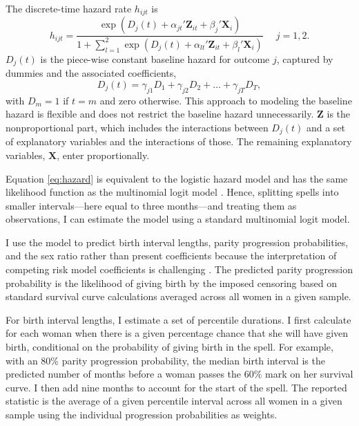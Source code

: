 \documentclass[12pt,letterpaper]{article}
\begin{document}
The discrete-time hazard rate $h_{ijt}$ is 
\begin{equation}
 h_{ijt} = \frac{\exp(D_j(t) + \alpha_{jt}'\mathbf{Z}_{it} + \beta_j'\mathbf{X}_{i})} 
 {1 + \sum_{l=1}^2 \exp(D_j(t) + \alpha_{lt}'\mathbf{Z}_{it} + \beta_l'\mathbf{X}_{i})} \: \: \; \; \;  j = 1,2.
 \label{eq:hazard}
\end{equation}
$D_{j}(t)$ is the piece-wise constant baseline hazard for outcome $j$, captured
by dummies and the associated coefficients,
\begin{equation}
D_j(t) = \gamma_{j1} D_1 + \gamma_{j2} D_2 + \ldots + \gamma_{jT} D_T,
\end{equation}
with $D_m = 1$ if $t=m$ and zero otherwise.
This approach to modeling the baseline hazard is flexible and does not restrict the 
baseline hazard unnecessarily.
$\mathbf{Z}$ is the nonproportional part, which includes the interactions between 
$D_j(t)$ and a set of explanatory variables and the interactions of those.
The remaining explanatory variables, $\mathbf{X}$, enter proportionally.




Equation \ref{eq:hazard} is equivalent to the logistic hazard model and has the same 
likelihood function as the multinomial logit model \citep{allison82,jenkins95}.
Hence, splitting spells into smaller intervals---here equal to three months---and 
treating them as observations, I can estimate the model using a standard multinomial 
logit model. 

I use the model to predict birth interval lengths, parity progression probabilities, 
and the sex ratio rather than present coefficients because the interpretation 
of competing risk model coefficients is challenging \citep{thomas96}.
The predicted parity progression probability is the likelihood of giving birth by the
imposed censoring based on standard survival curve calculations averaged across all
women in a given sample.

For birth interval lengths, I estimate a set of percentile durations. 
I first calculate for each woman when there is a given percentage chance that she will have 
given birth, conditional on the probability of giving birth in the spell. 
For example, with an 80\% parity progression probability, the median birth interval 
is the predicted number of months before a woman passes the 60\% mark on her survival 
curve. 
I then add nine months to account for the start of the spell. 
The reported statistic is the average of a given percentile interval across all women in 
a given sample using the individual progression probabilities as weights.
\end{document}
